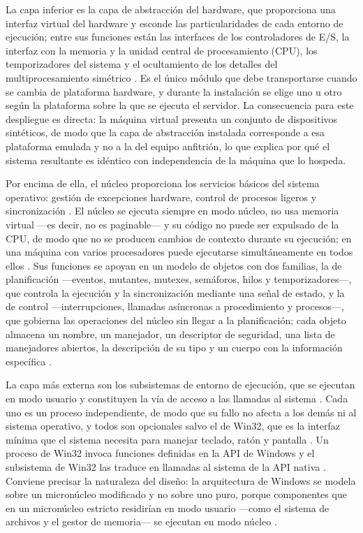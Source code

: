 \documentclass[12pt]{article}
\begin{document}
La capa inferior es la capa de abstracción del hardware, que proporciona una interfaz virtual del hardware y esconde las particularidades de cada entorno de ejecución; entre sus funciones están las interfaces de los controladores de E/S, la interfaz con la memoria y la unidad central de procesamiento (CPU), los temporizadores del sistema y el ocultamiento de los detalles del multiprocesamiento simétrico \parencite[\S 12.3, p.\ 621]{carretero2001sistemas}. Es el único módulo que debe transportarse cuando se cambia de plataforma hardware, y durante la instalación se elige uno u otro según la plataforma sobre la que se ejecuta el servidor. La consecuencia para este despliegue es directa: la máquina virtual presenta un conjunto de dispositivos sintéticos, de modo que la capa de abstracción instalada corresponde a esa plataforma emulada y no a la del equipo anfitrión, lo que explica por qué el sistema resultante es idéntico con independencia de la máquina que lo hospeda.

Por encima de ella, el núcleo proporciona los servicios básicos del sistema operativo: gestión de excepciones hardware, control de procesos ligeros y sincronización \parencite[\S 12.3, p.\ 621]{carretero2001sistemas}. El núcleo se ejecuta siempre en modo núcleo, no usa memoria virtual —es decir, no es paginable— y su código no puede ser expulsado de la CPU, de modo que no se producen cambios de contexto durante su ejecución; en una máquina con varios procesadores puede ejecutarse simultáneamente en todos ellos \parencite[\S 12.4, p.\ 623]{carretero2001sistemas}. Sus funciones se apoyan en un modelo de objetos con dos familias, la de planificación —eventos, mutantes, mutexes, semáforos, hilos y temporizadores—, que controla la ejecución y la sincronización mediante una señal de estado, y la de control —interrupciones, llamadas asíncronas a procedimiento y procesos—, que gobierna las operaciones del núcleo sin llegar a la planificación; cada objeto almacena un nombre, un manejador, un descriptor de seguridad, una lista de manejadores abiertos, la descripción de su tipo y un cuerpo con la información específica \parencite[\S 12.4, p.\ 623]{carretero2001sistemas}.

La capa más externa son los subsistemas de entorno de ejecución, que se ejecutan en modo usuario y constituyen la vía de acceso a las llamadas al sistema \parencite[\S 12.3, p.\ 622]{carretero2001sistemas}. Cada uno es un proceso independiente, de modo que su fallo no afecta a los demás ni al sistema operativo, y todos son opcionales salvo el de Win32, que es la interfaz mínima que el sistema necesita para manejar teclado, ratón y pantalla \parencite[\S 12.6, p.\ 635]{carretero2001sistemas}. Un proceso de Win32 invoca funciones definidas en la API de Windows y el subsistema de Win32 las traduce en llamadas al sistema de la API nativa \parencite[\S 21.4, p.\ 1043]{deitel2004operating}. Conviene precisar la naturaleza del diseño: la arquitectura de Windows se modela sobre un micronúcleo modificado y no sobre uno puro, porque componentes que en un micronúcleo estricto residirían en modo usuario ---como el sistema de archivos y el gestor de memoria--- se ejecutan en modo núcleo \parencite[\S 21.4, p.\ 1042]{deitel2004operating}.
\end{document}
